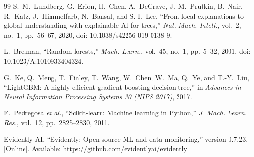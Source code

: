 \documentclass{ieeeaccess}
\begin{document}
\begin{thebibliography}{99}
S.~M.~Lundberg, G.~Erion, H.~Chen, A.~DeGrave, J.~M.~Prutkin, B.~Nair, R.~Katz, J.~Himmelfarb, N.~Bansal, and S.-I.~Lee, ``From local explanations to global understanding with explainable AI for trees,'' \emph{Nat. Mach. Intell.}, vol.~2, no.~1, pp.~56--67, 2020, doi: 10.1038/s42256-019-0138-9.

L.~Breiman, ``Random forests,'' \emph{Mach. Learn.}, vol.~45, no.~1, pp.~5--32, 2001, doi: 10.1023/A:1010933404324.

G.~Ke, Q.~Meng, T.~Finley, T.~Wang, W.~Chen, W.~Ma, Q.~Ye, and T.-Y.~Liu, ``LightGBM: A highly efficient gradient boosting decision tree,'' in \emph{Advances in Neural Information Processing Systems 30 (NIPS 2017)}, 2017.

F.~Pedregosa \emph{et al.}, ``Scikit-learn: Machine learning in Python,'' \emph{J. Mach. Learn. Res.}, vol.~12, pp.~2825--2830, 2011.

Evidently AI, ``Evidently: Open-source ML and data monitoring,'' version 0.7.23. [Online]. Available: \url{https://github.com/evidentlyai/evidently}

\end{thebibliography}

\EOD
\end{document}
